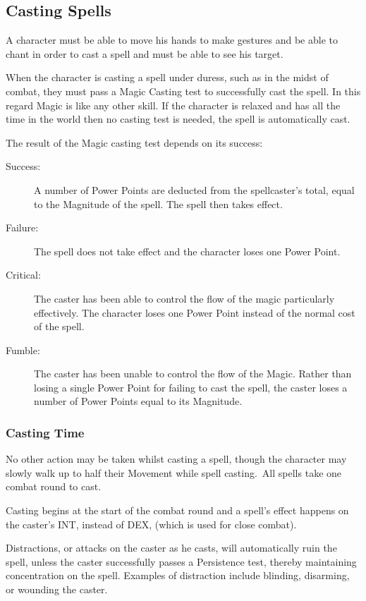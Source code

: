 \subsection{Casting Spells}
A character must be able to move his hands to make gestures and be able to chant in order to cast a spell and must be able to see his target. 

When the character is casting a spell under duress, such as in the midst of combat, they must pass a Magic Casting test to successfully cast the spell. In this regard Magic is like any other skill. If the character is relaxed and has all the time in the world then no casting test is needed, the spell is automatically cast.

The result of the Magic casting test depends on its success:
\begin{description}
	\item[Success:] A number of Power Points are deducted from the spellcaster’s total, equal to the Magnitude of the spell. The spell then takes effect.
	\item[Failure:] The spell does not take effect and the character loses one Power Point.
	\item[Critical:] The caster has been able to control the flow of the magic particularly effectively. The character loses one Power Point instead of the normal cost of the spell.
	\item[Fumble:] The caster has been unable to control the flow of the Magic. Rather than losing a single Power Point for failing to cast the spell, the caster loses a number of Power Points equal to its Magnitude. 
\end{description}

\subsubsection{Casting Time}
No other action may be taken whilst casting a spell, though the character may slowly walk up to half their Movement while spell casting. All spells take one combat round to cast.

Casting begins at the start of the combat round and a spell’s effect happens on the caster’s INT, instead of DEX, (which is used for close combat).  

Distractions, or attacks on the caster as he casts, will automatically ruin the spell, unless the caster successfully passes a Persistence test, thereby maintaining concentration on the spell. Examples of distraction include blinding, disarming, or wounding the caster.


